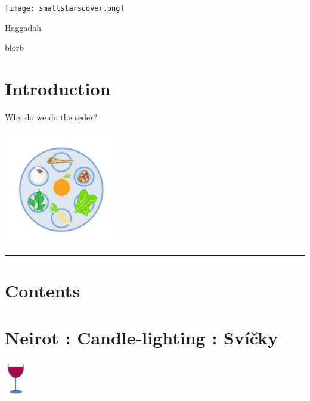 \documentclass[a5paper,10pt]{memoir}
\begin{document}
\texttt{[image: smallstarscover.png]}

\vspace*{-100ex}  %
\begin{center}
	\noindent \HUGE \color{cyan} Haggadah\centering
	\vfill
	\end{center}
\vspace*{80ex}  %
%
\onecolumn
blorb
\onecolumn
%
\section{Introduction}
{Why do we do the seder?}\\
\begin{center}
	\includegraphics[width=50mm]{Sederplate}
	\end{center}

{\color{cyan} \rule{\linewidth}{0.5mm}}
\onecolumn
\section{Contents}{%
	\ContentsColumnar
	\noindent
}
\onecolumn
%
\section{Neirot : Candle-lighting : Svíčky}

\Neirot
\vspace*{2ex}
\hfill\includegraphics[width=10mm]{cup}
\vspace*{-15ex}  %
		
\end{document}
